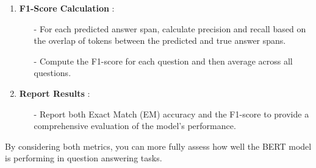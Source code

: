 \documentclass[10pt]{article}
\begin{document}
\begin{enumerate}
\begin{enumerate}
         \item { \bf F1-Score Calculation }:
         \begin{itemize}
            \item [-] For each predicted answer span, calculate precision and recall based on the overlap of tokens between the predicted and true answer spans.
            \item [-] Compute the F1-score for each question and then average across all questions.
         \end{itemize}

         \item { \bf Report Results }:
         \begin{itemize}
            \item [-] Report both Exact Match (EM) accuracy and the F1-score to provide a comprehensive evaluation of the model’s performance.
         \end{itemize}
      \end{enumerate}
\end{enumerate}

By considering both metrics, you can more fully assess how well the BERT model is performing in question answering tasks.
\end{document}
